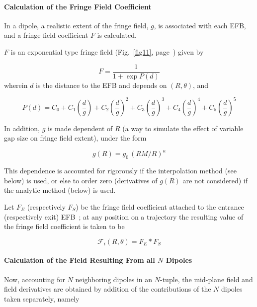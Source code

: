 {\paragraph{Calculation of the Fringe Field Coefficient} 

\noindent In a dipole, a realistic extent of the fringe field, $g $, 
is associated with  each EFB, and a fringe field coefficient $ F $ is calculated. 


\bigskip

\noindent$ F $ is an exponential type fringe field (Fig.~\ref{fig11}, page~\pageref{fig11}) 
given by~\cite{Biblio12}     %

$$ F = \dfrac{1 }{ 1+ \exp P(d)} $$
%
 wherein $ d $ is the distance to the EFB and depends on $(R,\theta)$, and 

$$
    P(d) = C_0
       +C_1 \left(  \dfrac{d }{ g } \right) 
       +C_2 \left( \dfrac{d }{ g } \right)^2 
       + C_3 \left( \dfrac{d }{ g } \right)^3 
       +C_4 \left( \dfrac{d }{ g } \right)^4 
       + C_5 \left(\dfrac{d }{ g } \right)^5 $$

\noindent In addition,   $g$ is made dependent  of $R$ 
(a way to simulate the effect of variable gap size on fringe field extent), 
under the form 

$$ g(R) = g_0 \, (RM/R)^{\kappa}  $$

\noindent  This dependence is accounted for rigorously if the interpolation method (see below) is 
used, or else to  order zero (derivatives of $g(R)$ are not considered) if the analytic method 
(below) is used. 

\smallskip

\noindent Let $ F_E $ (respectively $ F_S$)  be the fringe field
coefficient attached to the entrance (respectively exit) EFB~; at any position on  a 
trajectory the resulting value of the fringe field coefficient is taken to be 

\begin{equation}
\label{EqFFdips}
  \mathcal{F}_i(R,\theta) = F_E  \ast  F_S 
\end{equation}



\paragraph{Calculation of the  Field Resulting From all $N$ Dipoles \label{FFatAP}}

 
\noindent Now, accounting for   $N$ neighboring dipoles in an $N$-tuple,  the mid-plane field  and field derivatives  
are  obtained by addition of  the  contributions of the $N$ dipoles taken separately, namely

}
